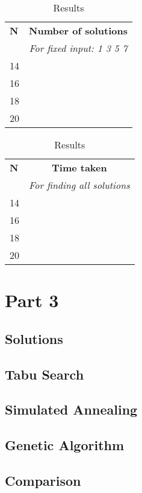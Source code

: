 \documentclass{article}
\begin{document}
\begin{table}[!htb]
	\begin{minipage}{.5\linewidth}
	      	\centering
		\begin{tabular}{ll}
		\textbf{N}               & \multicolumn{1}{c}{\textbf{Number of solutions}} \\ 
		                         & \multicolumn{1}{c}{\textit{For fixed input: 1 3 5 7}}    \\ \hline
		\multicolumn{1}{|l|}{14} & \multicolumn{1}{l|}{}                            \\ \hline
		\multicolumn{1}{|l|}{16} & \multicolumn{1}{l|}{}                            \\ \hline
		\multicolumn{1}{|l|}{18} & \multicolumn{1}{l|}{}                            \\ \hline
		\multicolumn{1}{|l|}{20} & \multicolumn{1}{l|}{}                            \\ \hline
		\end{tabular}
    	\end{minipage}%
	\begin{minipage}{.5\linewidth}
	      	\centering
		\begin{tabular}{ll}
		\textbf{N}               & \multicolumn{1}{c}{\textbf{Time taken}} \\
	                         & \multicolumn{1}{c}{\textit{For finding all solutions}}    \\ \hline
		\multicolumn{1}{|l|}{14} & \multicolumn{1}{l|}{}                            \\ \hline
		\multicolumn{1}{|l|}{16} & \multicolumn{1}{l|}{}                            \\ \hline
		\multicolumn{1}{|l|}{18} & \multicolumn{1}{l|}{}                            \\ \hline
		\multicolumn{1}{|l|}{20} & \multicolumn{1}{l|}{}                            \\ \hline
		\end{tabular}
    	\end{minipage}%
	\caption{Results}
\end{table}	



\section{Part 3}
\subsection{Solutions}
\subsection{Tabu Search}
\subsection{Simulated Annealing}
\subsection{Genetic Algorithm}
\subsection{Comparison}
\end{document}

